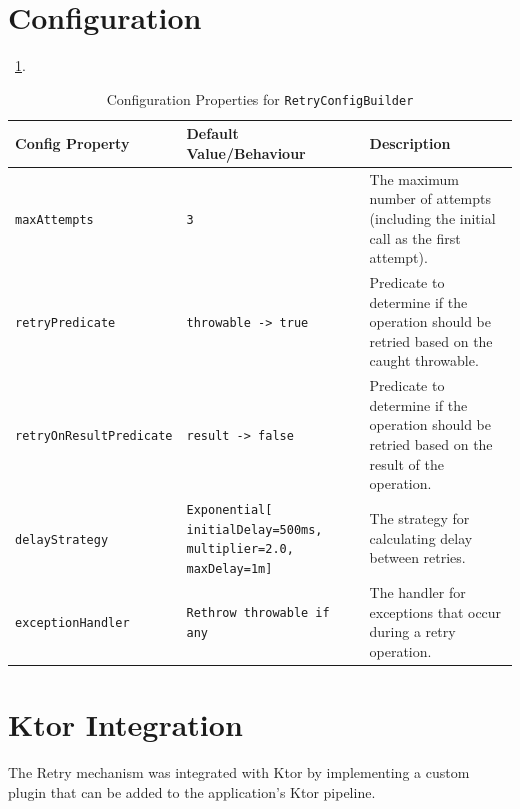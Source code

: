 \section{Configuration}\label{sec:retry-configuration}

~\ref{tab:retry-config-builder}.

\begin{table}[!htb]
    \centering
    \caption{Configuration Properties for \texttt{RetryConfigBuilder}}
    \label{tab:retry-config-builder}
    \vspace{0.3cm}
    \begin{tabular}{|l|p{5cm}|p{6cm}|}
        \hline
        \textbf{Config Property} & \textbf{Default Value/Behaviour} & \textbf{Description} \\ \hline
        \texttt{maxAttempts} & \texttt{3} & The maximum number of attempts
        (including the initial call as the first attempt). \\ \hline
        \texttt{retryPredicate} & \texttt{throwable ->
            true} & Predicate
        to determine if the operation should be retried based on the caught throwable. \\ \hline
        \texttt{retryOnResultPredicate} & \texttt{result ->
            false} & Predicate
        to determine if the operation should be retried based on the result of the operation. \\ \hline
        \texttt{delayStrategy} & \texttt{Exponential[ initialDelay=500ms, multiplier=2.0, maxDelay=1m]}          & The strategy
        for calculating delay between retries.                                             \\ \hline
        \texttt{exceptionHandler} & \texttt{Rethrow throwable
        if any} & The handler for exceptions that occur during a retry operation. \\ \hline
    \end{tabular}
\end{table}


\resilienceMechanismDefaultConfig


\section{Ktor Integration}\label{sec:retry-ktor-integration}

The Retry mechanism was integrated with Ktor
by implementing a custom plugin that can be added to the application's Ktor pipeline.

